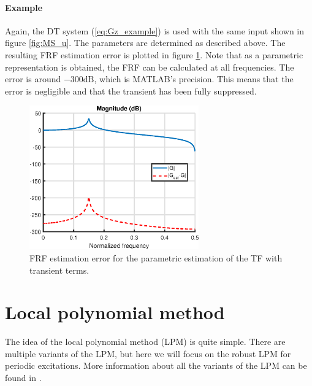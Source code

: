 \paragraph{Example}
Again, the DT system (\ref{eq:Gz_example}) is used with the same input shown in figure \ref{fig:MS_u}. The parameters are determined as described above. The resulting FRF estimation error is plotted in figure \ref{fig:transient_parametric}. Note that as a parametric representation is obtained, the FRF can be calculated at all frequencies. The error is around $-300 \text{dB}$, which is MATLAB's precision. This means that the error is negligible and that the transient has been fully suppressed.

\begin{figure}[H]
    \centering
    \includegraphics[width=0.65\textwidth]{figures/parametric_transient.eps}
    \caption{FRF estimation error for the parametric estimation of the TF with transient terms.}
    \label{fig:transient_parametric}
\end{figure}


\section{Local polynomial method}
\label{sec:LPM}
The idea of the local polynomial method (LPM) is quite simple. There are multiple variants of the LPM, but here we will focus on the robust LPM for periodic excitations. More information about all the variants of the LPM can be found in \cite[Chapter 7]{pintelon_book}.

